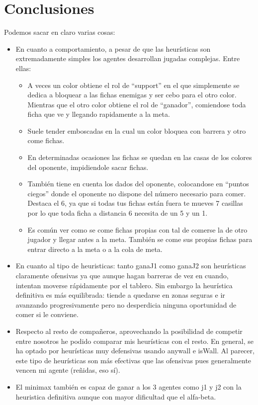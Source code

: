 \documentclass[12pt, spanish]{article}
\begin{document}
\section{Conclusiones}
Podemos sacar en claro varias cosas:
\begin{itemize}
 \item En cuanto a comportamiento, a pesar de que las heurísticas son extremadamente simples los agentes desarrollan jugadas complejas. Entre ellas:
 \begin{itemize}
  \item A veces un color obtiene el rol de ``support'' en el que simplemente se dedica a bloquear a las fichas enemigas y ser cebo para el otro color. Mientras que el otro color obtiene el rol de ``ganador'', comiendose toda ficha que ve y llegando rapidamente a la meta.

  \item Suele tender emboscadas en la cual un color bloquea con barrera y otro come fichas.

  \item En determinadas ocasiones las fichas se quedan en las casas de los colores del oponente, impidiendole sacar fichas.

  \item También tiene en cuenta los dados del oponente, colocandose en ``puntos ciegos'' donde el oponente no dispone del número necesario para comer. Destaca el 6, ya que si todas tus fichas están fuera te mueves 7 casillas por lo que toda ficha a distancia 6 necesita de un 5 y un 1.

  \item Es común ver como se come fichas propias con tal de comerse la de otro jugador y llegar antes a la meta. También se come sus propias fichas para entrar directo a la meta o a la cola de meta.

 \end{itemize}

 \item En cuanto al tipo de heuristicas: tanto ganaJ1 como ganaJ2 son heurísticas claramente ofensivas ya que aunque hagan barreras de vez en cuando, intentan moverse rápidamente por el tablero. Sin embargo la heurística definitiva es más equilibrada: tiende a quedarse en zonas seguras e ir avanzando progresivamente pero no desperdicia ninguna oportunidad de comer si le conviene.

 \item Respecto al resto de compañeros, aprovechando la posibilidad de competir entre nosotros he podido comparar mis heurísticas con el resto. En general, se ha optado por heurísticas muy defensivas usando anywall e isWall. Al parecer, este tipo de heurísticas son más efectivas que las ofensivas pues generalmente vencen mi agente (reñidas, eso sí).

 \item El minimax también es capaz de ganar a los 3 agentes como j1 y j2 con la heuristica definitiva aunque con mayor dificultad que el alfa-beta.

\end{itemize}


\vspace{5cm}
 
 
\end{document}
